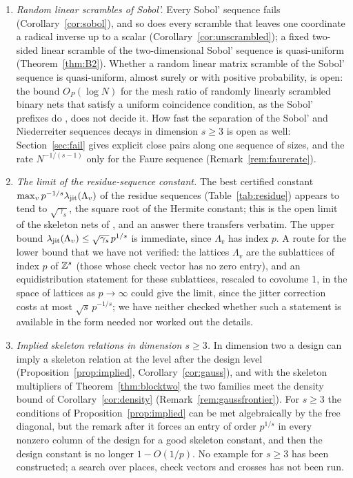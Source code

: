 \begin{enumerate}
\item \emph{Random linear scrambles of Sobol'.} Every Sobol' sequence fails (Corollary~\ref{cor:sobol}), and so does every scramble that leaves one coordinate a radical inverse up to a scalar (Corollary~\ref{cor:unscrambled}); a fixed two-sided linear scramble of the two-dimensional Sobol' sequence is quasi-uniform (Theorem~\ref{thm:B2}). Whether a random linear matrix scramble of the Sobol' sequence is quasi-uniform, almost surely or with positive probability, is open: the bound $O_P(\log N)$ for the mesh ratio of randomly linearly scrambled binary nets that satisfy a uniform coincidence condition, as the Sobol' prefixes do \cite[Thm.~5.5, Lem.~4.10]{Suz26}, does not decide it. How fast the separation of the Sobol' and Niederreiter sequences decays in dimension $s\ge3$ is open as well: Section~\ref{sec:fail} gives explicit close pairs along one sequence of sizes, and the rate $N^{-1/(s-1)}$ only for the Faure sequence (Remark~\ref{rem:faurerate}).
\item \emph{The limit of the residue-sequence constant.} The best certified constant $\max_vp^{-1/s}\lambda_{\mathrm{jit}}(\Lambda_v)$ of the residue sequences (Table~\ref{tab:residue}) appears to tend to $\sqrt{\gamma_s}$, the square root of the Hermite constant; this is the open limit of the skeleton nets of \cite{Gru26geo}%
, and an answer there transfers verbatim. The upper bound $\lambda_{\mathrm{jit}}(\Lambda_v)\le\sqrt{\gamma_s}\,p^{1/s}$ is immediate, since $\Lambda_v$ has index $p$. A route for the lower bound that we have not verified: the lattices $\Lambda_v$ are the sublattices of index $p$ of $\mathbb{Z}^s$ (those whose check vector has no zero entry), and an equidistribution statement for these sublattices, rescaled to covolume $1$, in the space of lattices as $p\to\infty$ could give the limit, since the jitter correction costs at most $\sqrt s\,p^{-1/s}$; we have neither checked whether such a statement is available in the form needed nor worked out the details.
\item \emph{Implied skeleton relations in dimension $s\ge3$.} In dimension two a design can imply a skeleton relation at the level after the design level (Proposition~\ref{prop:implied}, Corollary~\ref{cor:gauss}), and with the skeleton multipliers of Theorem~\ref{thm:blocktwo} the two families meet the density bound of Corollary~\ref{cor:density} (Remark~\ref{rem:gaussfrontier}). For $s\ge3$ the conditions of Proposition~\ref{prop:implied} can be met algebraically by the free diagonal, but the remark after it forces an entry of order $p^{1/s}$ in every nonzero column of the design for a good skeleton constant, and then the design constant is no longer $1-O(1/p)$. No example for $s\ge3$ has been constructed; a search over places, check vectors and crosses has not been run.

\end{enumerate}
